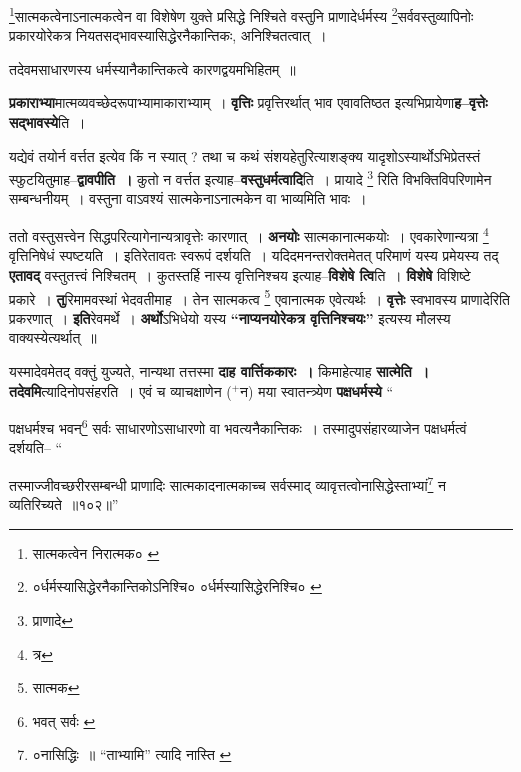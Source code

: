 \documentclass[article,12pt,a4paper]{memoir}
\newcommand{\add}[1]{($^{+}$#1)}
\begin{document}
	  \endgroup
	 

	  \pstart \footnote{सात्मकत्वेन निरात्मक० \cite{dp-msD}}सात्मकत्वेनाऽनात्मकत्वेन वा विशेषेण युक्ते प्रसिद्धे निश्चिते वस्तुनि प्राणादेर्धर्मस्य \footnote{०र्धर्मस्यासिद्धेरनैकान्तिकोऽनिश्चि० \cite{dp-msA} \cite{dp-msB} \cite{dp-edP} \cite{dp-edH} \cite{dp-edE} \cite{dp-edN} ०र्धर्मस्यासिद्धेरनिश्चि० \cite{dp-msC}}सर्ववस्तुव्यापिनोः प्रकारयोरेकत्र नियतसद्भावस्यासिद्धेरनैकान्तिकः, अनिश्चितत्वात् ।
	\pend
       

	  \pstart तदेवमसाधारणस्य धर्मस्यानैकान्तिकत्वे कारणद्वयमभिहितम् ॥
	\pend
      
	  \endgroup
	

	  \pstart \textbf{प्रकाराभ्या}मात्मव्यवच्छेदरूपाभ्यामाकाराभ्याम् । \textbf{वृत्तिः} प्रवृत्तिरर्थात् भाव एवावतिष्ठत इत्यभिप्रायेणा\textbf{ह--वृत्तेः सद्भावस्ये}ति ।
	\pend
      

	  \pstart यद्येवं तयोर्न वर्त्तत इत्येव किं न स्यात् ? तथा च कथं संशयहेतुरित्याशङ्क्य यादृशोऽस्यार्थोऽभिप्रेतस्तं स्फुटयितुमाह--\textbf{द्वावपीति ।} कुतो न वर्त्तत इत्याह--\textbf{वस्तुधर्मत्वादि}ति । प्रायादे \footnote{प्राणादे} रिति विभक्तिविपरिणामेन सम्बन्धनीयम् । वस्तुना वाऽवश्यं सात्मकेनाऽनात्मकेन वा भाव्यमिति भावः ।
	\pend
      

	  \pstart ततो वस्तुसत्त्वेन सिद्धपरित्यागेनान्यत्रावृत्तेः कारणात् । \textbf{अनयोः} सात्मकानात्मकयोः । एवकारेणान्यत्रा \footnote{त्र} वृत्तिनिषेधं स्पष्टयति । इतिरेतावतः स्वरूपं दर्शयति । यदिदमनन्तरोक्तमेतत् परिमाणं यस्य प्रमेयस्य तद् \textbf{एतावद्} वस्तुतत्त्वं निश्चितम् । कुतस्तर्हि नास्य वृत्तिनिश्चय इत्याह--\textbf{विशेषे त्वि}ति । \textbf{विशेषे} विशिष्टे प्रकारे । \textbf{तु}रिमामवस्थां भेदवतीमाह । तेन सात्मकत्व \footnote{सात्मक} एवानात्मक एवेत्यर्थः । \textbf{वृत्तेः} स्वभावस्य प्राणादेरिति प्रकरणात् । \textbf{इति}रेवमर्थे । \textbf{अर्थो}ऽभिधेयो यस्य \textbf{“नाप्यनयोरेकत्र वृत्तिनिश्चयः”} इत्यस्य मौलस्य वाक्यस्येत्यर्थात् ॥
	\pend
      

	  \pstart यस्मादेवमेतद् वक्तुं युज्यते, नान्यथा तत्तस्मा \leavevmode{} \textbf{दाह वार्त्तिककारः ।} किमाहेत्याह \textbf{सात्मेति । तदेवमि}त्यादिनोपसंहरति । एवं च व्याचक्षाणेन \add{न} मया स्वातन्त्र्येण \textbf{पक्षधर्मस्ये}  \leavevmode{} “
	  
	पक्षधर्मश्च भवन्\footnote{भवत् सर्वः \cite{dp-msA}} सर्वः साधारणोऽसाधारणो वा भवत्यनैकान्तिकः । तस्मादुपसंहारव्याजेन पक्षधर्मत्वं दर्शयति-- “
	  
	तस्माज्जीवच्छरीरसम्बन्धी प्राणादिः सात्मकादनात्मकाच्च सर्वस्माद् व्यावृत्तत्वोनासिद्धेस्ताभ्यां\footnote{०नासिद्धिः ॥ \cite{dp-edE} “ताभ्यामि” त्यादि नास्ति \cite{dp-edE}} न व्यतिरिच्यते ॥१०२॥” 
	  
\end{document}
